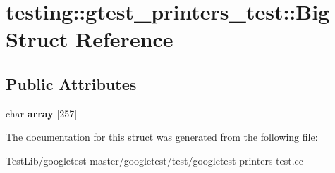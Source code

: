 \hypertarget{structtesting_1_1gtest__printers__test_1_1Big}{}\section{testing\+:\+:gtest\+\_\+printers\+\_\+test\+:\+:Big Struct Reference}
\label{structtesting_1_1gtest__printers__test_1_1Big}
\subsection*{Public Attributes}
\begin{DoxyCompactItemize}
\item 
\mbox{\label{structtesting_1_1gtest__printers__test_1_1Big_a863911a8ec5c3bbe79c44d399f1de61f}} 
char {\bfseries array} \mbox{[}257\mbox{]}
\end{DoxyCompactItemize}


The documentation for this struct was generated from the following file\+:\begin{DoxyCompactItemize}
\item 
Test\+Lib/googletest-\/master/googletest/test/googletest-\/printers-\/test.\+cc\end{DoxyCompactItemize}
